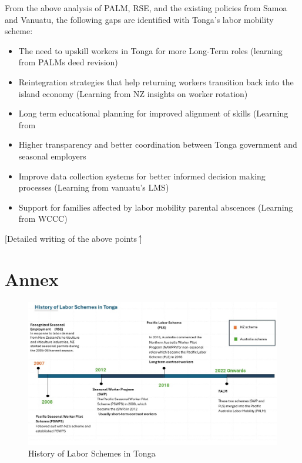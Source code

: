 \documentclass[9pt,a4paper,twocolumn,twoside]{tau-class/tau}
\begin{document}
\begin{tauenv}[frametitle=Policy Response]
        From the above analysis of PALM, RSE, and the existing policies from Samoa and Vanuatu, the following gaps are identified with Tonga's labor mobility scheme:  
        \begin{itemize}
            \item The need to upskill workers in Tonga for more Long-Term roles (learning from PALMs deed revision)
            \item Reintegration strategies that help returning workers transition back into the island economy (Learning from NZ insights on worker rotation)
            \item Long term educational planning for improved alignment of skills (Learning from 
            \item Higher transparency and better coordination between Tonga government and seasonal employers
            \item Improve data collection systems for better informed decision making processes (Learning from vanuatu's LMS)
            \item Support for families affected by labor mobility parental abscences (Learning from WCCC)

        \end{itemize}
\end{tauenv}

[Detailed writing of the above points \^]

\section{Annex}

	
    	\begin{figure}[H]
    		\centering
    		\includegraphics[width=0.9\columnwidth]{figures/timeline_LS.jpg}
    		\caption{History of Labor Schemes in Tonga}
    		\label{fig:Timeline}
    	\end{figure}
\end{document}
